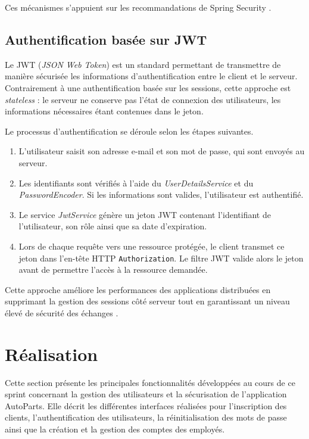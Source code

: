 Ces mécanismes s'appuient sur les recommandations de Spring Security \cite{springSecurityDoc,springInAction}.



\subsection{Authentification basée sur JWT}

Le \ac{JWT} (\textit{JSON Web Token}) est un standard permettant de transmettre de manière sécurisée les informations d'authentification entre le client et le serveur. Contrairement à une authentification basée sur les sessions, cette approche est \textit{stateless} : le serveur ne conserve pas l'état de connexion des utilisateurs, les informations nécessaires étant contenues dans le jeton.

Le processus d'authentification se déroule selon les étapes suivantes.

\begin{enumerate}
    \item L'utilisateur saisit son adresse e-mail et son mot de passe, qui sont envoyés au serveur.

    \item Les identifiants sont vérifiés à l'aide du \textit{UserDetailsService} et du \textit{PasswordEncoder}. Si les informations sont valides, l'utilisateur est authentifié.

    \item Le service \textit{JwtService} génère un jeton JWT contenant l'identifiant de l'utilisateur, son rôle ainsi que sa date d'expiration.

    \item Lors de chaque requête vers une ressource protégée, le client transmet ce jeton dans l'en-tête HTTP \texttt{Authorization}. Le filtre JWT valide alors le jeton avant de permettre l'accès à la ressource demandée.
\end{enumerate}

Cette approche améliore les performances des applications distribuées en supprimant la gestion des sessions côté serveur tout en garantissant un niveau élevé de sécurité des échanges \cite{jwtRFC}.


\section{Réalisation}

Cette section présente les principales fonctionnalités développées au cours de ce sprint concernant la gestion des utilisateurs et la sécurisation de l'application AutoParts. Elle décrit les différentes interfaces réalisées pour l'inscription des clients, l'authentification des utilisateurs, la réinitialisation des mots de passe ainsi que la création et la gestion des comptes des employés.

